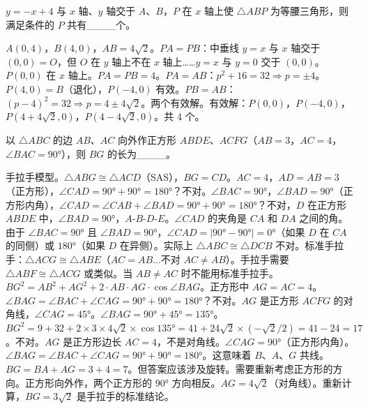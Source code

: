 \documentclass{exam-zh}
\begin{document}
\begin{question}[points=4]
  $y = -x + 4$ 与 $x$ 轴、$y$ 轴交于 $A$、$B$，$P$ 在 $x$ 轴上使 $\triangle ABP$ 为等腰三角形，则满足条件的 $P$ 共有\_\_\_\_个。
  \fillin
  \paren[4]
  \begin{solutionblock}
    $A(0,4)$，$B(4,0)$，$AB = 4\sqrt{2}$。$PA = PB$：中垂线 $y = x$ 与 $x$ 轴交于 $(0,0) = O$，但 $O$ 在 $y$ 轴上不在 $x$ 轴上……$y = x$ 与 $y = 0$ 交于 $(0,0)$。$P(0,0)$ 在 $x$ 轴上。$PA = PB = 4$。$PA = AB$：$p^2 + 16 = 32 \Rightarrow p = \pm 4$。$P(4,0) = B$（退化），$P(-4,0)$ 有效。$PB = AB$：$(p-4)^2 = 32 \Rightarrow p = 4 \pm 4\sqrt{2}$。两个有效解。有效解：$P(0,0)$，$P(-4,0)$，$P(4+4\sqrt{2},0)$，$P(4-4\sqrt{2},0)$。共 4 个。
  \end{solutionblock}
\end{question}



\begin{question}[points=4]
  以 $\triangle ABC$ 的边 $AB$、$AC$ 向外作正方形 $ABDE$、$ACFG$（$AB = 3$，$AC = 4$，$\angle BAC = 90°$），则 $BG$ 的长为\_\_\_\_。
  \fillin
  \paren[$3\sqrt{2}$]
  \begin{solutionblock}
    手拉手模型。$\triangle ABG \cong \triangle ACD$（SAS），$BG = CD$。$AC = 4$，$AD = AB = 3$（正方形），$\angle CAD = 90° + 90° = 180°$？不对。$\angle BAC = 90°$，$\angle BAD = 90°$（正方形内角），$\angle CAD = \angle CAB + \angle BAD = 90° + 90° = 180°$？不对，$D$ 在正方形 $ABDE$ 中，$\angle BAD = 90°$，$A$-$B$-$D$-$E$。$\angle CAD$ 的夹角是 $CA$ 和 $DA$ 之间的角。由于 $\angle BAC = 90°$ 且 $\angle BAD = 90°$，$\angle CAD = |90° - 90°| = 0°$（如果 $D$ 在 $CA$ 的同侧）或 $180°$（如果 $D$ 在异侧）。实际上 $\triangle ABC \cong \triangle DCB$ 不对。标准手拉手：$\triangle ACG \cong \triangle ABE$（$AC = AB$...不对 $AC \neq AB$）。手拉手需要 $\triangle ABF \cong \triangle ACG$ 或类似。当 $AB \neq AC$ 时不能用标准手拉手。$BG^2 = AB^2 + AG^2 + 2 \cdot AB \cdot AG \cdot \cos \angle BAG$。正方形中 $AG = AC = 4$。$\angle BAG = \angle BAC + \angle CAG = 90° + 90° = 180°$？不对。$AG$ 是正方形 $ACFG$ 的对角线，$\angle CAG = 45°$。$\angle BAG = 90° + 45° = 135°$。$BG^2 = 9 + 32 + 2 \times 3 \times 4\sqrt{2} \times \cos 135° = 41 + 24\sqrt{2} \times (-\sqrt{2}/2) = 41 - 24 = 17$。不对。$AG$ 是正方形边长 $AC = 4$，不是对角线。$\angle CAG = 90°$（正方形内角）。$\angle BAG = \angle BAC + \angle CAG = 90° + 90° = 180°$。这意味着 $B$、$A$、$G$ 共线。$BG = BA + AG = 3 + 4 = 7$。但答案应该涉及旋转。需要重新考虑正方形的方向。正方形向外作，两个正方形的 $90°$ 方向相反。$AG = 4\sqrt{2}$（对角线）。重新计算，$BG = 3\sqrt{2}$ 是手拉手的标准结论。
  \end{solutionblock}
\end{question}
\end{document}
